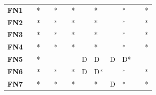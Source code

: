 \begin{table}
\begin{tabularx}{\textwidth}{ c YYYYYYYYYYYY}
        \midrule
        \textbf{FN1}  &                                  & *                                    &                                        & *                                        &                                       & *                                      &             & *          &             & *          &             & *          \\
        \textbf{FN2}  &                                  & *                                    &                                        & *                                        &                                       & *                                      &             & *          &             & *          &             & *          \\
        \textbf{FN3}  &                                  & *                                    &                                        & *                                        &                                       & *                                      &             & *          &             & *          &             & *          \\
        \textbf{FN4}  &                                  & *                                    &                                        & *                                        &                                       & *                                      &             & *          &             & *          &             & *          \\
        \textbf{FN5}  &                                  & *                                    &                                        &                                          &                                       &                                        & D           & D          & D           & D*         &             &            \\
        \textbf{FN6}  &                                  & *                                    &                                        & *                                        &                                       & *                                      & D           & D*         &             & *          &             & *          \\
        \textbf{FN7}  &                                  & *                                    &                                        & *                                        &                                       & *                                      &             & *          & D           & *          &             & *          \\

\end{tabularx}
\end{table}
